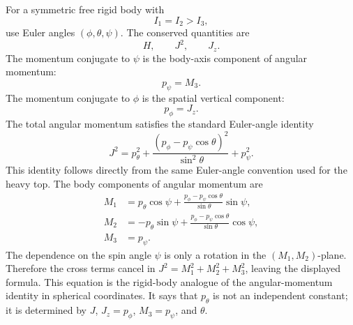 For a symmetric free rigid body with
\[
  I_1=I_2>I_3,
\]
use Euler angles \((\phi,\theta,\psi)\). The conserved quantities are
\[
  H,\qquad J^2,\qquad J_z.
\]
The momentum conjugate to \(\psi\) is the body-axis component of angular
momentum:
\[
  p_\psi=M_3.
\]
The momentum conjugate to \(\phi\) is the spatial vertical component:
\[
  p_\phi=J_z.
\]
The total angular momentum satisfies the standard Euler-angle identity
\[
  J^2
  =
  p_\theta^2
  +
  \frac{(p_\phi-p_\psi\cos\theta)^2}{\sin^2\theta}
  +
  p_\psi^2.
\]
This identity follows directly from the same Euler-angle convention used for
the heavy top.  The body components of angular momentum are
\[
\begin{aligned}
  M_1
  &=
  p_\theta\cos\psi
  +
  \frac{p_\phi-p_\psi\cos\theta}{\sin\theta}\sin\psi,\\
  M_2
  &=
  -p_\theta\sin\psi
  +
  \frac{p_\phi-p_\psi\cos\theta}{\sin\theta}\cos\psi,\\
  M_3&=p_\psi .
\end{aligned}
\]
The dependence on the spin angle \(\psi\) is only a rotation in the
\((M_1,M_2)\)-plane.  Therefore the cross terms cancel in
\(J^2=M_1^2+M_2^2+M_3^2\), leaving the displayed formula.
This equation is the rigid-body analogue of the angular-momentum identity in
spherical coordinates. It says that \(p_\theta\) is not an independent
constant; it is determined by \(J\), \(J_z=p_\phi\), \(M_3=p_\psi\), and
\(\theta\).

